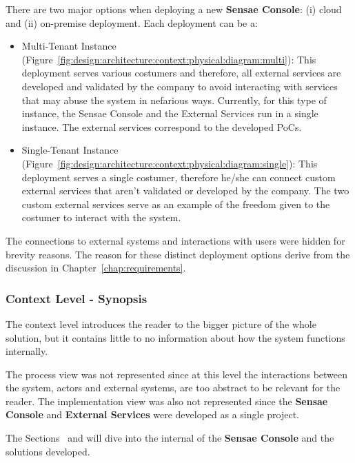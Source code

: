 There are two major options when deploying a new \textbf{Sensae Console}: (i) cloud and (ii) on-premise deployment.
Each deployment can be a:

\begin{itemize}
   \item Multi-Tenant Instance (Figure~\ref{fig:design:architecture:context:physical:diagram:multi}): This deployment serves various costumers and therefore, all external services are developed and validated by the company to avoid interacting with services that may abuse the system in nefarious ways. Currently, for this type of instance, the Sensae Console and the External Services run in a single instance. The external services correspond to the developed \gls{PoC}s.
   \item Single-Tenant Instance (Figure~\ref{fig:design:architecture:context:physical:diagram:single}): This deployment serves a single costumer, therefore he/she can connect custom external services that aren't validated or developed by the company. The two custom external services serve as an example of the freedom given to the costumer to interact with the system. 
\end{itemize}

The connections to external systems and interactions with users were hidden for brevity reasons. The reason for these distinct deployment options derive from the discussion in Chapter~\ref{chap:requirements}.  

\subsubsection{Context Level - Synopsis}
\label{subsubsec:design:architecture:context:synopsis}

The context level introduces the reader to the bigger picture of the whole solution, but it contains little to no information about how the system functions internally.

The process view was not represented since at this level the interactions between the system, actors and external systems, are too abstract to be relevant for the reader.
The implementation view was also not represented since the \textbf{Sensae Console} and \textbf{External Services} were developed as a single project.

The Sections~ and  will dive into the internal of the \textbf{Sensae Console} and the solutions developed.

